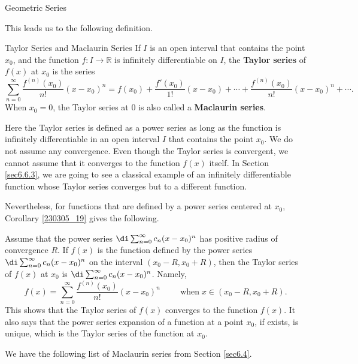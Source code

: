 \begin{example}[label=230305_16]{Geometric Series}
\begin{example}[label=230304_9]{}
\begin{example}{}
This leads us to the following definition.
\begin{definition}{Taylor Series and Maclaurin Series}
If $I$ is an open interval that contains the point $x_0$, and the function $f:I\to\mathbb{R}$ is infinitely differentiable on $I$,  the {\bf Taylor series} of $f(x)$ at $x_0$ is the series
\[\sum_{n=0}^{\infty}\frac{f^{(n)}(x_0)}{n!}(x-x_0)^n=f(x_0)+\frac{f'(x_0)}{1!}(x-x_0) +\cdots+\frac{f^{(n)}(x_0)}{n!}(x-x_0)^n+\cdots.\]When $x_0=0$, the Taylor series at $0$ is also called a {\bf Maclaurin series}.
\end{definition}Here the Taylor series is defined as a power series as long as the function is infinitely differentiable in an open interval $I$ that contains the point $x_0$. We do not assume any convergence. Even though the Taylor series is convergent, we cannot assume that it converges to the function $f(x)$ itself. In Section \ref{sec6.6.3}, we are going to see a classical example of an infinitely differentiable function whose Taylor series converges but to a different function.

Nevertheless, for functions that are defined by a power series centered at $x_0$, Corollary \ref{230305_19} gives the following.
\begin{theorem}[label=230306_3]{}
Assume that the power series $\di\sum_{n=0}^{\infty}c_n(x-x_0)^n$ has positive radius of convergence $R$. If $f(x)$ is the function defined by the power series $\di\sum_{n=0}^{\infty}c_n(x-x_0)^n$ on the interval $(x_0-R, x_0+R)$, then the Taylor series of $f(x)$ at $x_0$ is $\di\sum_{n=0}^{\infty}c_n(x-x_0)^n$. Namely,
\[f(x)=\sum_{n=0}^{\infty}\frac{f^{(n)}(x_0)}{n!}(x-x_0)^n\hspace{1cm}\text{when}\;x\in (x_0-R, x_0+R).\]This shows that the Taylor series of $f(x)$ converges to the function $f(x)$.
It also says that the power series expansion of a function at a point $x_0$, if exists,  is unique, which is the Taylor series of the function at $x_0$.
\end{theorem}
We have the following list of Maclaurin series from Section \ref{sec6.4}.


\end{example}
\end{example}
\end{example}
